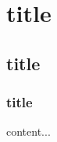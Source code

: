 \documentclass{report}
\begin{document}
	\chapter{title}
	\section{title}
	\subsection{title}
	\begin{description}
		content...
	\end{description}
\end{document}
